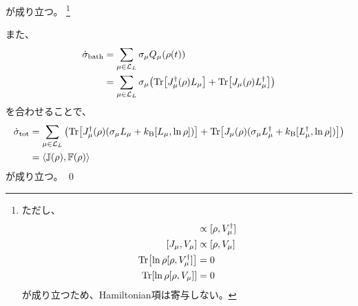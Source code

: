 \documentclass[a4paper,11pt]{jsarticle}
\numberwithin{equation}{section}
\begin{document}
が成り立つ。
\footnote{ただし、
\begin{align}
    [J_{\mu}, V_{\mu}^{\dagger}] &\propto [\rho, V_{\mu}^{\dagger}]\\
    [J_{\mu}, V_{\mu}] &\propto [\rho, V_{\mu}]\\
    \Tr[\ln\rho [\rho, V_{\mu}^{\dagger}]] &= 0 \\
    \Tr[\ln\rho [\rho, V_{\mu}]] &= 0
\end{align}
が成り立つため、Hamiltonian項は寄与しない。
}

また、
\begin{align}
    \dot{\sigma}_{\text{bath}} &= \sum_{\mu \in \mathcal{L}_{L}} \sigma_{\mu} Q_{\mu}(\rho(t)) \\
    &= \sum_{\mu \in \mathcal{L}_{L}} \sigma_{\mu} \qty( \Tr[ J_{\mu}^{\dagger}(\rho) L_{\mu} ] + \Tr[ J_{\mu}(\rho) L_{\mu}^{\dagger} ]) 
\end{align}
を合わせることで、
\begin{align}
    \dot{\sigma}_{\text{tot}} &= \sum_{\mu \in \mathcal{L}_{L}} \qty( \Tr[ J_{\mu}^{\dagger}(\rho) (\sigma_{\mu} L_{\mu} + k_{\text{B}} [L_{\mu}, \ln \rho] ) ] + \Tr[ J_{\mu}(\rho) (\sigma_{\mu} L_{\mu}^{\dagger} + k_{\text{B}} [L_{\mu}^{\dagger}, \ln \rho] ) ]) \\
    &= \ev{ \mathbb{J}(\rho) , \mathbb{F}(\rho) }
\end{align}
が成り立つ。
\qed\\
\end{document}
